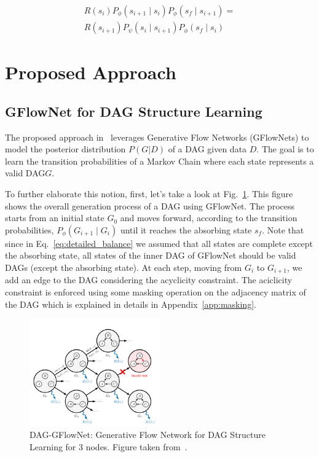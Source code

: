 \documentclass{lxaiproposal}
\begin{document}
    \begin{equation}
        \begin{aligned}
            R(s_i) P_{\phi}(s_{i+1} \mid s_i)P_{\phi}(s_f \mid s_{i+1})=\\
            R(s_{i+1}) P_{\psi}(s_i \mid s_{i+1})P_{\phi}(s_f \mid s_i)
        \end{aligned}
        \label{eq:detailed_balance}
    \end{equation}


    \section{Proposed Approach}\label{sec:proposed_approach}

    \subsection{GFlowNet for DAG Structure Learning}

    The proposed approach in~\cite{deleu2022daggflownet} leverages Generative Flow Networks (GFlowNets) to model the
    posterior distribution $P(G|D)$ of a DAG given data $D$. The goal is to learn the transition probabilities of a
    Markov Chain where each state represents a valid DAG$G$.

    To further elaborate this notion, first, let's take a look at Fig.~\ref{fig:dag_gflownet}. This figure shows the
    overall generation process of a DAG using GFlowNet. The process starts from an initial state $G_0$ and moves
    forward, according to the transition probabilities, $P_{\phi}(G_{i+1} \mid G_i)$ until it reaches the absorbing state
    $s_f$. Note that since in Eq.~\eqref{eq:detailed_balance} we assumed that all states are complete except the
    absorbing state, all states of the inner DAG of GFlowNet should be valid DAGs (except the absorbing state).
    At each step, moving from $G_i$ to $G_{i+1}$, we add an edge to the DAG considering the acyclicity constraint.
    The aciclicity constraint is enforced using some masking operation on the adjacency matrix of the DAG which is
    explained in details in Appendix~\ref{app:masking}.


    \begin{figure}[h]
        \centering
        \includegraphics[width=0.5\textwidth]{figures/dag_gflownet}
        \caption{DAG-GFlowNet: Generative Flow Network for DAG Structure Learning for 3 nodes. Figure taken from~\cite{deleu2022daggflownet}.}
        \label{fig:dag_gflownet}
    \end{figure}
\end{document}
